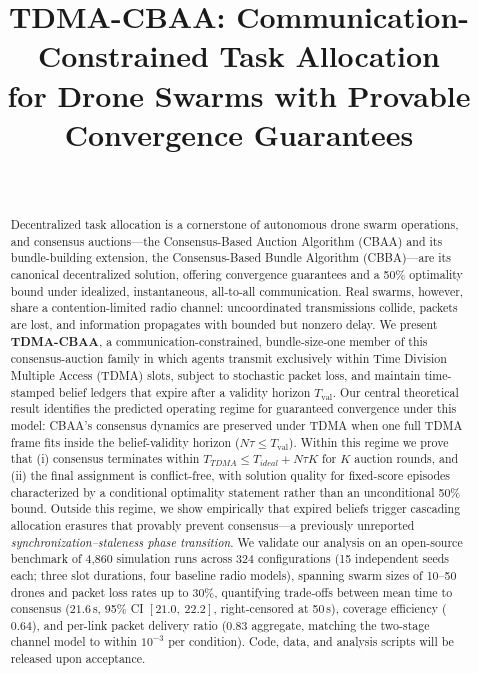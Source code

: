 \documentclass[conference]{IEEEtran}
\begin{document}
\title{TDMA-CBAA: Communication-Constrained Task Allocation\\ for Drone Swarms with Provable Convergence Guarantees}

\author{\\
}

\maketitle

\begin{abstract}
Decentralized task allocation is a cornerstone of autonomous drone swarm operations, and consensus auctions---the Consensus-Based Auction Algorithm (CBAA) and its bundle-building extension, the Consensus-Based Bundle Algorithm (CBBA)---are its canonical decentralized solution, offering convergence guarantees and a 50\% optimality bound under idealized, instantaneous, all-to-all communication.
Real swarms, however, share a contention-limited radio channel: uncoordinated transmissions collide, packets are lost, and information propagates with bounded but nonzero delay.
We present \textbf{TDMA-CBAA}, a communication-constrained, bundle-size-one member of this consensus-auction family in which agents transmit exclusively within Time Division Multiple Access (TDMA) slots, subject to stochastic packet loss, and maintain time-stamped belief ledgers that expire after a validity horizon $T_{\mathrm{val}}$.
Our central theoretical result identifies the predicted operating regime for guaranteed convergence under this model: CBAA's consensus dynamics are preserved under TDMA when one full TDMA frame fits inside the belief-validity horizon ($N\tau \leq T_{\mathrm{val}}$).
Within this regime we prove that (i) consensus terminates within $T_{TDMA} \leq T_{ideal} + N\tau K$ for $K$ auction rounds, and (ii) the final assignment is conflict-free, with solution quality for fixed-score episodes characterized by a conditional optimality statement rather than an unconditional 50\% bound.
Outside this regime, we show empirically that expired beliefs trigger cascading allocation erasures that provably prevent consensus---a previously unreported \emph{synchronization--staleness phase transition}.
We validate our analysis on an open-source benchmark of 4{,}860 simulation runs across 324 configurations (15 independent seeds each; three slot durations, four baseline radio models), spanning swarm sizes of 10--50 drones and packet loss rates up to 30\%, quantifying trade-offs between mean time to consensus ($21.6$\,s, 95\% CI $[21.0,\ 22.2]$, right-censored at 50\,s), coverage efficiency ($0.64$), and per-link packet delivery ratio ($0.83$ aggregate, matching the two-stage channel model to within $10^{-3}$ per condition).
Code, data, and analysis scripts will be released upon acceptance.
\end{abstract}
\end{document}

